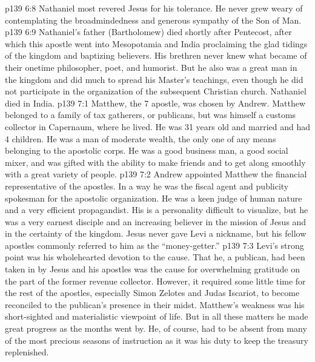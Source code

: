 \vs p139 6:8 \pc Nathaniel most revered Jesus for his tolerance. He never grew weary of contemplating the broadmindedness and generous sympathy of the Son of Man.
\vs p139 6:9 \pc Nathaniel’s father (Bartholomew) died shortly after Pentecost, after which this apostle went into Mesopotamia and India proclaiming the glad tidings of the kingdom and baptizing believers. His brethren never knew what became of their onetime philosopher, poet, and humorist. But he also was a great man in the kingdom and did much to spread his Master’s teachings, even though he did not participate in the organization of the subsequent Christian church. Nathaniel died in India.
\vs p139 7:1 Matthew, the 7 apostle, was chosen by Andrew. Matthew belonged to a family of tax gatherers, or publicans, but was himself a customs collector in Capernaum, where he lived. He was 31 years old and married and had 4 children. He was a man of moderate wealth, the only one of any means belonging to the apostolic corps. He was a good business man, a good social mixer, and was gifted with the ability to make friends and to get along smoothly with a great variety of people.
\vs p139 7:2 \pc Andrew appointed Matthew the financial representative of the apostles. In a way he was the fiscal agent and publicity spokesman for the apostolic organization. He was a keen judge of human nature and a very efficient propagandist. His is a personality difficult to visualize, but he was a very earnest disciple and an increasing believer in the mission of Jesus and in the certainty of the kingdom. Jesus never gave Levi a nickname, but his fellow apostles commonly referred to him as the “money\hyp{}getter.”
\vs p139 7:3 Levi’s strong point was his wholehearted devotion to the cause. That he, a publican, had been taken in by Jesus and his apostles was the cause for overwhelming gratitude on the part of the former revenue collector. However, it required some little time for the rest of the apostles, especially Simon Zelotes and Judas Iscariot, to become reconciled to the publican’s presence in their midst. Matthew’s weakness was his short\hyp{}sighted and materialistic viewpoint of life. But in all these matters he made great progress as the months went by. He, of course, had to be absent from many of the most precious seasons of instruction as it was his duty to keep the treasury replenished.
